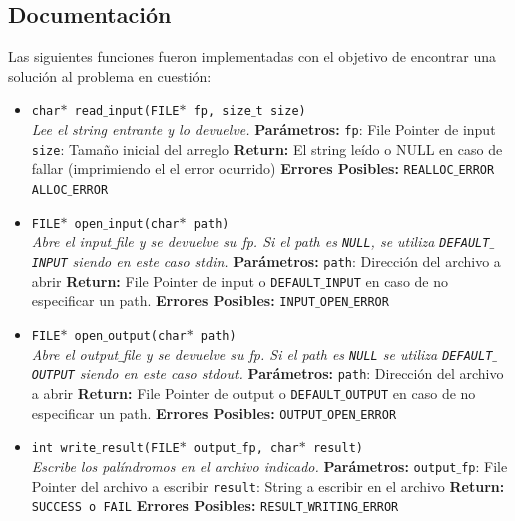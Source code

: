 \documentclass[a4paper, 10pt]{article}
\def\code#1{\texttt{#1}}
\begin{document}
		\subsection{Documentación}
			Las siguientes funciones fueron implementadas con el objetivo de encontrar una solución al problema 
			en cuestión:
			\begin{itemize}
			
				\item \code{char$*$ read$\_$input(FILE$*$ fp, size$\_$t size)} 
				\\\textit{Lee el string entrante y lo devuelve.}
					\subitem \textbf{Parámetros:} 
						\subsubitem \code{fp}: File Pointer de input
						\subsubitem \code{size}: Tamaño inicial del arreglo
					\subitem \textbf{Return:} 
						\subsubitem El string leído o NULL en caso de fallar
						(imprimiendo el el error ocurrido)
					\subitem \textbf{Errores Posibles:} 
						\subsubitem \code{REALLOC$\_$ERROR} 
						\subsubitem \code{ALLOC$\_$ERROR}
						
				\item \code{FILE$*$ open$\_$input(char$*$ path)} 
				\\\textit{Abre el input$\_$file y se devuelve su fp. 
				Si el path es \code{NULL},
				se utiliza \code{DEFAULT$\_$INPUT} siendo en este caso stdin.}
					\subitem \textbf{Parámetros:} 
						\subsubitem \code{path}: Dirección del archivo a abrir
					\subitem \textbf{Return:} 
						\subsubitem File Pointer de input o \code{DEFAULT$\_$INPUT} 
						en caso de no especificar un path.
					\subitem \textbf{Errores Posibles:} 
						\subsubitem \code{INPUT$\_$OPEN$\_$ERROR}
				
				\item \code{FILE$*$ open$\_$output(char$*$ path)} 
				\\\textit{Abre el output$\_$file y se devuelve su fp. Si el path es \code{NULL}
				se utiliza \code{DEFAULT$\_$OUTPUT} siendo en este caso stdout.}
					\subitem \textbf{Parámetros:} 
						\subsubitem \code{path}: Dirección del archivo a abrir
					\subitem \textbf{Return:} 
						\subsubitem File Pointer de output o \code{DEFAULT$\_$OUTPUT} en caso de 
						no especificar un path.
					\subitem \textbf{Errores Posibles:} 
						\subsubitem \code{OUTPUT$\_$OPEN$\_$ERROR}				

				\item \code{int write$\_$result(FILE$*$ output$\_$fp, char$*$ result)} 
				\\\textit{Escribe los palíndromos en el archivo indicado.}
					\subitem \textbf{Parámetros:} 
						\subsubitem \code{output$\_$fp}: File Pointer del archivo a escribir
						\subsubitem \code{result}: String a escribir en el archivo
					\subitem \textbf{Return:} 
						\subsubitem \code{SUCCESS o FAIL}
					\subitem \textbf{Errores Posibles:} 
						\subsubitem \code{RESULT$\_$WRITING$\_$ERROR}
						

\end{itemize}
\end{document}
